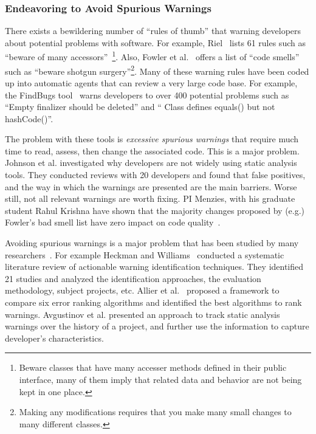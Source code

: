 \documentclass{NSF}
\begin{document}
\begin{nsfdescription}
\subsubsection{Endeavoring to Avoid Spurious Warnings}\label{tion:falsealarm}


There exists a bewildering number of   ``rules of thumb'' 
that warning developers about potential problems with software.
For example,
Riel~\cite{riel1996object} lists 61  rules such as ``beware of many accessors''~\footnote{Beware  classes that have many accesser  methods defined in their public interface, many of them imply that related data and behavior are not being kept in one place.}. 
Also, 
Fowler et al.~\cite{fowler99}
offers  a list of ``code smells'' such as ``beware shotgun surgery''\footnote{Making any modifications requires that you make many small changes to many different classes.}. 
Many of these warning rules
have been coded up into automatic agents that can review  a very large code base.
For example, the FindBugs   tool~\cite{Ayewah08} warns  developers to over 400 potential problems such as ``Empty finalizer should be deleted'' and `` Class defines equals() but not hashCode()''.

 The problem with these  tools is  {\em excessive
spurious warnings} that require much time to read, assess, then change the associated
code.
This is a major problem.
Johnson et al. \cite{johnson2013don} investigated why developers are not widely using static analysis tools. They conducted reviews with 20 developers
and found that false positives, and the way in which the warnings
are presented are the main barriers. 
Worse still,   not all relevant warnings are worth fixing.
PI Menzies, with his graduate student Rahul Krishna have shown that the majority
  changes proposed by (e.g.) Fowler's bad smell list have zero
  impact on code quality~\cite{KrishnaML16}.



  
  
  Avoiding spurious warnings is a major problem that has been
  studied by
  many researchers~\cite{hanam2014finding, heckman2008establishing, heckman2009model, kim2007prioritizing, kim2007warnings, kremenek2004correlation,liang2010automatic, ruthruff2008predicting,shen2011efindbugs,
yuksel2013automated}. For example 
Heckman and Williams~\cite{heckman2009model}
conducted a systematic literature
review of actionable warning identification techniques. They identified 21 studies and analyzed the identification approaches, the
evaluation methodology, subject projects, etc. Allier et al.~\cite{allier2012framework} proposed a framework to compare six error ranking algorithms and
identified the best algorithms to rank warnings. 
Avgustinov et al. \cite{avgustinov2015tracking} presented
an approach to track static analysis warnings over the history of
a project, and further use the information to capture developer's
characteristics.  


\end{nsfdescription}
\end{document}
